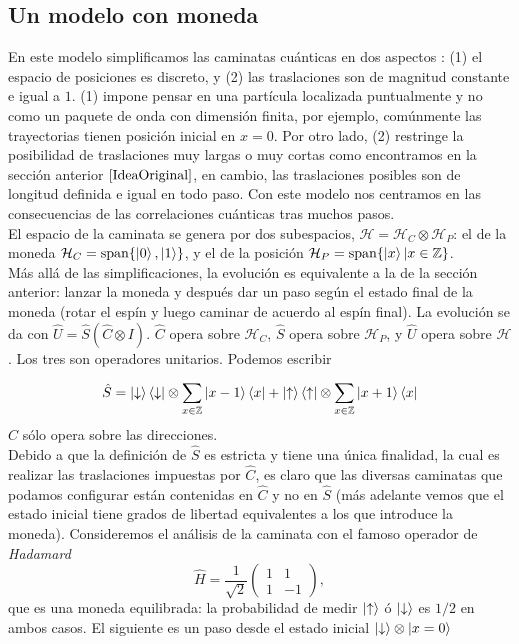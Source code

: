 \subsection{Un modelo con moneda}\label{sec:LineaInfinita}
En este modelo simplificamos las caminatas cuánticas en dos aspectos \cite{kempe2003quantum} : (1) el espacio de posiciones es discreto, y (2) las traslaciones son de magnitud constante e igual a $1$. (1) impone pensar en una partícula localizada puntualmente y no como un paquete de onda con dimensión finita, por ejemplo, comúnmente las trayectorias tienen posición inicial en $x=0$. 
Por otro lado, (2) restringe la posibilidad de traslaciones muy largas o muy cortas como encontramos en la sección anterior $\ref{IdeaOriginal}$, en cambio, las traslaciones posibles son de longitud definida e igual en todo paso. Con este modelo nos centramos en las consecuencias de las correlaciones cuánticas tras muchos pasos.\\

El espacio de la caminata se genera por dos subespacios, $\mathcal{H}=\mathcal{H}_C\otimes\mathcal{H}_P$: el de la moneda
$\mathcal{H}_C=\text{span}\{\ket{0},\ket{1}\}$, y el de la posición $\mathcal{H}_P=\text{span}\{\ket{x}|x\in \mathbb{Z}\}$. \\

Más allá de las simplificaciones, la evolución es equivalente a la de la sección anterior: lanzar la moneda y después dar un paso según el estado final de la moneda (rotar el espín y luego caminar de acuerdo al espín final). 
La evolución se da con $\hat{U}=\hat{S}(\hat{C}\otimes I)$. $\hat{C}$ opera sobre $\mathcal{H}_C$,  $\hat{S}$ opera sobre $\mathcal{H}_P$, y $\hat{U}$ opera sobre $\mathcal{H}$. Los tres son operadores unitarios.
Podemos escribir

\begin{equation}
\hat{S}=\ket{\downarrow}\bra{\downarrow}\otimes \sum_{x\in \mathbb{Z}}\ket{x-1}\bra{x}+\ket{\uparrow}\bra{\uparrow}\otimes \sum_{x\in \mathbb{Z}}\ket{x+1}\bra{x}
\end{equation}{}
$\hat{C}$ sólo opera sobre las direcciones.\\

Debido a que la definición de $\hat{S}$ es estricta y tiene una única finalidad, la cual es realizar las traslaciones impuestas por $\hat{C}$, es claro que las diversas caminatas que podamos configurar están contenidas en $\hat{C}$ y no en $\hat{S}$ (más adelante vemos que el estado inicial tiene grados de libertad equivalentes a los que introduce la moneda).
Consideremos el análisis de la caminata con el famoso operador de \textit{Hadamard}
\begin{equation}
\hat{H}=\frac{1}{\sqrt{2}}
\begin{pmatrix}
1 & 1\\
1 & -1
\end{pmatrix},
\end{equation}{}
que es una moneda equilibrada: la probabilidad de medir $\ket{\uparrow}$ ó $\ket{\downarrow}$ es $1/2$ en ambos casos. El siguiente es un paso desde el estado inicial $\ket{\downarrow}\otimes\ket{x=0}$


